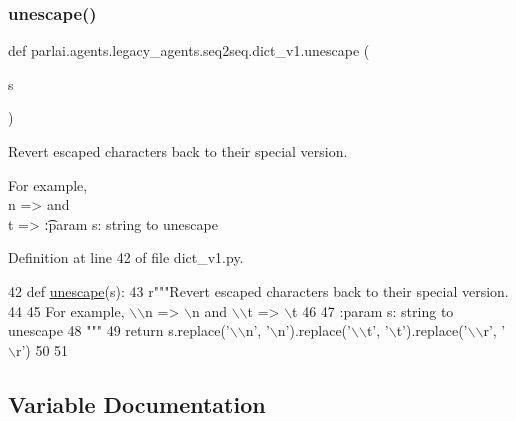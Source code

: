 \subsubsection{\texorpdfstring{unescape()}{unescape()}}
{\footnotesize\ttfamily def parlai.\+agents.\+legacy\+\_\+agents.\+seq2seq.\+dict\+\_\+v1.\+unescape (\begin{DoxyParamCaption}\item[{}]{s }\end{DoxyParamCaption})}

\begin{DoxyVerb}Revert escaped characters back to their special version.

For example, \\n => \n and \\t => \t

:param s: string to unescape
\end{DoxyVerb}
 

Definition at line 42 of file dict\+\_\+v1.\+py.


\begin{DoxyCode}
42 \textcolor{keyword}{def }\hyperlink{namespaceparlai_1_1agents_1_1legacy__agents_1_1seq2seq_1_1dict__v1_affad139ddec76996dc9a93f6123d545e}{unescape}(s):
43     \textcolor{stringliteral}{r"""Revert escaped characters back to their special version.}
44 \textcolor{stringliteral}{}
45 \textcolor{stringliteral}{    For example, \(\backslash\)\(\backslash\)n => \(\backslash\)n and \(\backslash\)\(\backslash\)t => \(\backslash\)t}
46 \textcolor{stringliteral}{}
47 \textcolor{stringliteral}{    :param s: string to unescape}
48 \textcolor{stringliteral}{    """}
49     \textcolor{keywordflow}{return} s.replace(\textcolor{stringliteral}{'\(\backslash\)\(\backslash\)n'}, \textcolor{stringliteral}{'\(\backslash\)n'}).replace(\textcolor{stringliteral}{'\(\backslash\)\(\backslash\)t'}, \textcolor{stringliteral}{'\(\backslash\)t'}).replace(\textcolor{stringliteral}{'\(\backslash\)\(\backslash\)r', '}\(\backslash\)r')
50 
51 
\end{DoxyCode}


\subsection{Variable Documentation}
\mbox{\label{namespaceparlai_1_1agents_1_1legacy__agents_1_1seq2seq_1_1dict__v1_a62905088b0069e57b6c6de4f778535ba}} 
